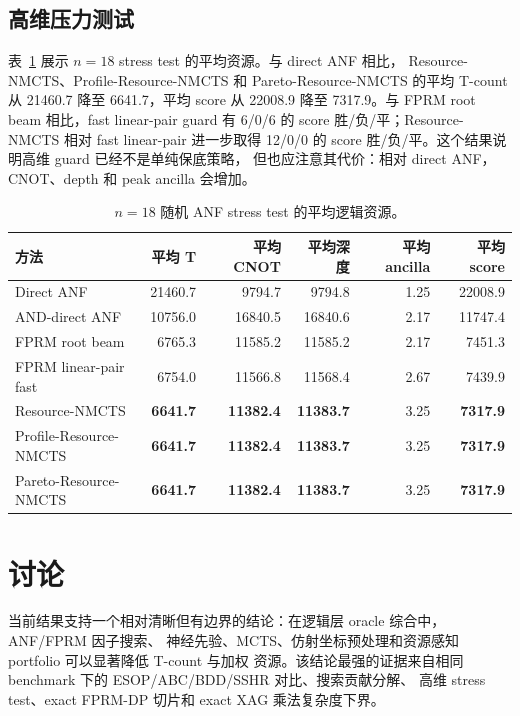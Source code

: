 \documentclass[UTF8,fontset=macnew,11pt]{ctexart}
\newcommand{\method}{Resource-NMCTS}
\newcommand{\paretomethod}{Pareto-Resource-NMCTS}
\begin{document}
\subsection{高维压力测试}

表~\ref{tab:mega-zh} 展示 $n=18$ stress test 的平均资源。与 direct ANF 相比，
\method{}、Profile-Resource-NMCTS 和 \paretomethod{} 的平均 T-count 从 21460.7
降至 6641.7，平均 score 从 22008.9 降至 7317.9。与 FPRM root beam 相比，fast
linear-pair guard 有 6/0/6 的 score 胜/负/平；\method{} 相对 fast linear-pair
进一步取得 12/0/0 的 score 胜/负/平。这个结果说明高维 guard 已经不是单纯保底策略，
但也应注意其代价：相对 direct ANF，CNOT、depth 和 peak ancilla 会增加。

\begin{table}[t]
\centering
\small
\caption{$n=18$ 随机 ANF stress test 的平均逻辑资源。}
\label{tab:mega-zh}
\begin{tabular}{lrrrrr}
\toprule
方法 & 平均 T & 平均 CNOT & 平均深度 & 平均 ancilla & 平均 score \\
\midrule
Direct ANF & 21460.7 & 9794.7 & 9794.8 & 1.25 & 22008.9 \\
AND-direct ANF & 10756.0 & 16840.5 & 16840.6 & 2.17 & 11747.4 \\
FPRM root beam & 6765.3 & 11585.2 & 11585.2 & 2.17 & 7451.3 \\
FPRM linear-pair fast & 6754.0 & 11566.8 & 11568.4 & 2.67 & 7439.9 \\
\method{} & \textbf{6641.7} & \textbf{11382.4} & \textbf{11383.7} & 3.25 & \textbf{7317.9} \\
Profile-Resource-NMCTS & \textbf{6641.7} & \textbf{11382.4} & \textbf{11383.7} & 3.25 & \textbf{7317.9} \\
\paretomethod{} & \textbf{6641.7} & \textbf{11382.4} & \textbf{11383.7} & 3.25 & \textbf{7317.9} \\
\bottomrule
\end{tabular}
\end{table}

\section{讨论}

当前结果支持一个相对清晰但有边界的结论：在逻辑层 oracle 综合中，ANF/FPRM 因子搜索、
神经先验、MCTS、仿射坐标预处理和资源感知 portfolio 可以显著降低 T-count 与加权
资源。该结论最强的证据来自相同 benchmark 下的 ESOP/ABC/BDD/SSHR 对比、搜索贡献分解、
高维 stress test、exact FPRM-DP 切片和 exact XAG 乘法复杂度下界。
\end{document}
